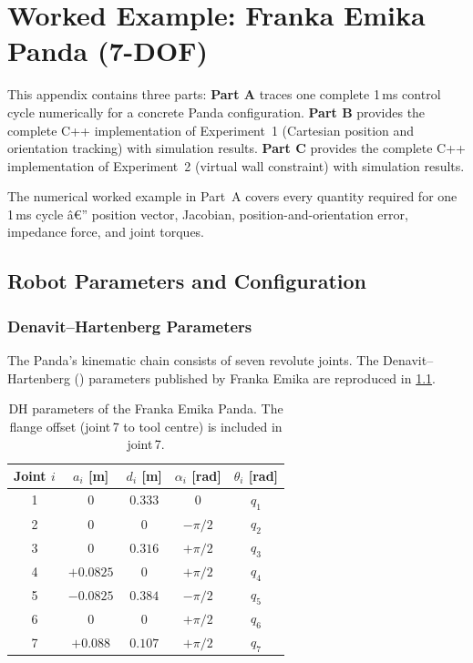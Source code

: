 ﻿\chapter{Worked Example: Franka Emika Panda (7-DOF)}
\label{app:panda}

This appendix contains three parts:
\textbf{Part A} traces one complete 1\,ms control cycle numerically for
a concrete Panda configuration.
\textbf{Part B} provides the complete C++ implementation of Experiment~1
(Cartesian position and orientation tracking) with simulation results.
\textbf{Part C} provides the complete C++ implementation of Experiment~2
(virtual wall constraint) with simulation results.

The numerical worked example in Part~A covers every quantity required for
one 1\,ms cycle â€” position vector, Jacobian, position-and-orientation error, impedance force,
and joint torques.

\section{Robot Parameters and Configuration}
\label{app:panda_params}

\subsection{Denavit--Hartenberg Parameters}

The Panda's kinematic chain consists of seven revolute joints.
The Denavit--Hartenberg () parameters published by Franka Emika \cite{FrankaFCI2023}
are reproduced in \cref{tab:panda_dh}.

\begin{table}[htb]
\centering
\caption{DH parameters of the Franka Emika Panda.
         The flange offset (joint\,7 to tool centre) is included in joint\,7.}
\label{tab:panda_dh}
\renewcommand{\arraystretch}{1.3}
\begin{tabular}{@{}ccccc@{}}
\toprule
Joint $i$ & $a_i$ [m] & $d_i$ [m] & $\alpha_i$ [rad] & $\theta_i$ [rad] \\
\midrule
1 & $0$        & $0.333$  & $0$           & $q_1$ \\
2 & $0$        & $0$      & $-\pi/2$      & $q_2$ \\
3 & $0$        & $0.316$  & $+\pi/2$      & $q_3$ \\
4 & $+0.0825$  & $0$      & $+\pi/2$      & $q_4$ \\
5 & $-0.0825$  & $0.384$  & $-\pi/2$      & $q_5$ \\
6 & $0$        & $0$      & $+\pi/2$      & $q_6$ \\
7 & $+0.088$   & $0.107$  & $+\pi/2$      & $q_7$ \\
\bottomrule
\end{tabular}
\end{table}

